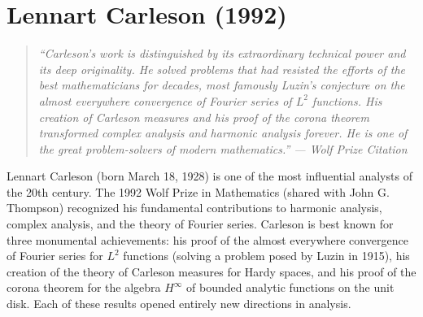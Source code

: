 \let\R\relax
\newcommand{\R}{\mathbb{R}}
\let\C\relax
\newcommand{\C}{\mathbb{C}}
\let\N\relax
\newcommand{\N}{\mathbb{N}}
\let\Z\relax
\newcommand{\Z}{\mathbb{Z}}
\let\Q\relax
\newcommand{\Q}{\mathbb{Q}}
\let\D\relax
\newcommand{\D}{\mathbb{D}}
\let\T\relax
\newcommand{\T}{\mathbb{T}}
\let\SO\relax
\newcommand{\SO}{\operatorname{SO}}
\let\SL\relax
\newcommand{\SL}{\operatorname{SL}}
\let\GL\relax
\newcommand{\GL}{\operatorname{GL}}
\let\St\relax
\newcommand{\St}{\operatorname{St}}
\let\GV\relax
\newcommand{\GV}{\operatorname{GV}}
\let\E\relax
\newcommand{\E}{\operatorname{E}}
\let\supp\relax
\newcommand{\supp}{\operatorname{supp}}
\let\diam\relax
\newcommand{\diam}{\operatorname{diam}}
\let\dist\relax
\newcommand{\dist}{\operatorname{dist}}
\let\Lip\relax
\newcommand{\Lip}{\operatorname{Lip}}
\let\Hol\relax
\newcommand{\Hol}{\operatorname{Hol}}
\let\Log\relax
\newcommand{\Log}{\operatorname{Log}}
\let\Area\relax
\newcommand{\Area}{\operatorname{Area}}
\let\vol\relax
\newcommand{\vol}{\operatorname{vol}}
\let\Aut\relax
\newcommand{\Aut}{\operatorname{Aut}}

\chapter{Lennart Carleson (1992)}

\begin{quote}
\it ``Carleson's work is distinguished by its extraordinary technical power and its deep originality. He solved problems that had resisted the efforts of the best mathematicians for decades, most famously Luzin's conjecture on the almost everywhere convergence of Fourier series of \(L^2\) functions. His creation of Carleson measures and his proof of the corona theorem transformed complex analysis and harmonic analysis forever. He is one of the great problem-solvers of modern mathematics.'' --- Wolf Prize Citation
\end{quote}

Lennart Carleson (born March 18, 1928) is one of the most influential analysts of the 20th century. The 1992 Wolf Prize in Mathematics (shared with John G. Thompson) recognized his fundamental contributions to harmonic analysis, complex analysis, and the theory of Fourier series. Carleson is best known for three monumental achievements: his proof of the almost everywhere convergence of Fourier series for \(L^2\) functions (solving a problem posed by Luzin in 1915), his creation of the theory of Carleson measures for Hardy spaces, and his proof of the corona theorem for the algebra \(H^\infty\) of bounded analytic functions on the unit disk. Each of these results opened entirely new directions in analysis.

